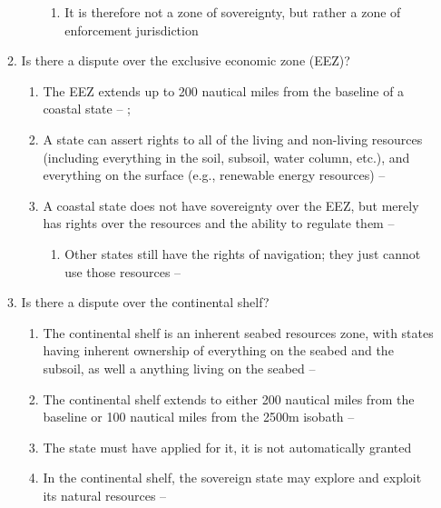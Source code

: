 \begin{enumerate}
\begin{enumerate}
\begin{enumerate}
            \begin{enumerate}
                \item It is therefore not a zone of sovereignty, but rather a zone of enforcement jurisdiction
            \end{enumerate}
        \end{enumerate}
        \item Is there a dispute over the exclusive economic zone (EEZ)?
        \begin{enumerate}
            \item The EEZ extends up to 200 nautical miles from the baseline of a coastal state -- ; 
            \item A state can assert rights to all of the living and non-living resources (including everything in the soil, subsoil, water column, etc.), and everything on the surface (e.g., renewable energy resources) -- 
            \item A coastal state does not have sovereignty over the EEZ, but merely has rights over the resources and the ability to regulate them -- 
            \begin{enumerate}
                \item Other states still have the rights of navigation; they just cannot use those resources -- 
            \end{enumerate}
        \end{enumerate}
        \item Is there a dispute over the continental shelf?
        \begin{enumerate}
            \item The continental shelf is an inherent seabed resources zone, with states having inherent ownership of everything on the seabed and the subsoil, as well a anything living on the seabed -- 
            \item The continental shelf extends to either 200 nautical miles from the baseline or 100 nautical miles from the 2500m isobath -- 
            \item The state must have applied for it, it is not automatically granted
            \item In the continental shelf, the sovereign state may explore and exploit its natural resources -- 

\end{enumerate}
\end{enumerate}
\end{enumerate}
